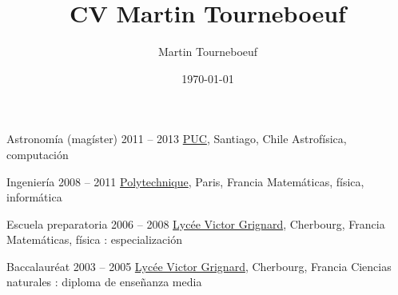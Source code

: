
\def\tbflanguage{spanish}
\def\tbfbordertop{1}
\def\tbfborderleft{0.7}

\ifx\HCode\undefined

\else
%

\fi

\title{CV Martin Tourneboeuf}
\author{Martin Tourneboeuf}
\date{\today}








\begin{coordinatelist}
\end{coordinatelist}




\begin{yearlist}[7.7][\tbfborderleft][4]

\item[Astronomía (magíster)]{2011 -- 2013}
    {
    \href{http://www.uc.cl/}{PUC}, Santiago, Chile
    }
    {    Astrofísica, computación}


\item[Ingeniería]{2008 -- 2011}
    {
    \tbfix
    \href{https://www.polytechnique.edu/}{Polytechnique}, Paris, Francia
    }
    {    Matemáticas, física, informática}


\item[Escuela preparatoria]{2006 -- 2008}
    {
    \href{http://www.lycee-grignard.fr/}{Lycée Victor Grignard}, Cherbourg, Francia
    }
    {    Matemáticas, física : especialización\nolinebreak}

\item[Baccalaur\'eat]{2003 -- 2005}
    {
    \href{http://www.lycee-grignard.fr/}{Lycée Victor Grignard}, Cherbourg, Francia
    }
    {    Ciencias naturales : diploma de enseñanza media}

\end{yearlist}



